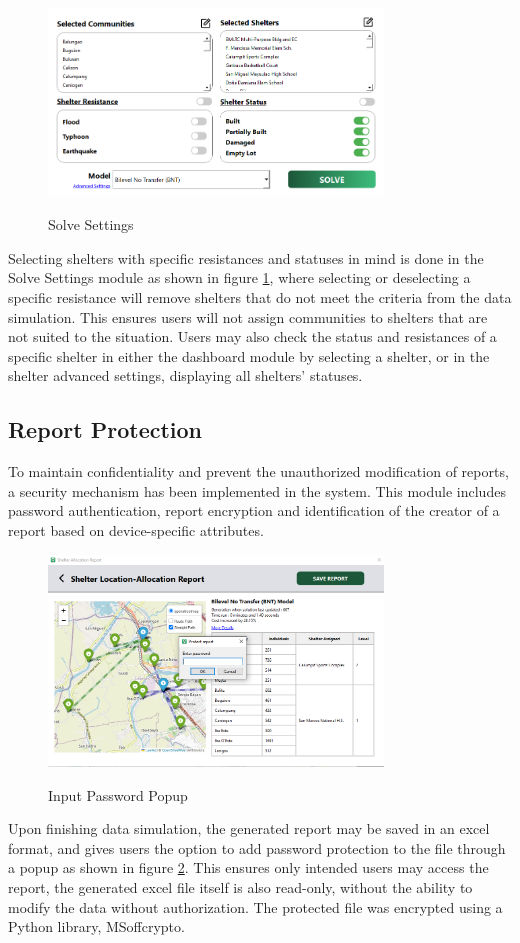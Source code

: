 	\begin{figure}[h!]
		\caption{Solve Settings}
		\centering
		\includegraphics[width=3.5in]{Chapter 4/solvesettings}
		\label{solveSet}
	\end{figure}
	Selecting shelters with specific resistances and statuses in mind is done in the Solve Settings module as shown in figure \ref{solveSet}, where selecting or deselecting a specific resistance will remove shelters that do not meet the criteria from the data simulation. This ensures users will not assign communities to shelters that are not suited to the situation. Users may also check the status and resistances of a specific shelter in either the dashboard module by selecting a shelter, or in the shelter advanced settings, displaying all shelters’ statuses.
	

\subsection{Report Protection}
	To maintain confidentiality and prevent the unauthorized modification of reports, a security mechanism has been implemented in the system. This module includes password authentication, report encryption and identification of the creator of a report based on device-specific attributes.
	
	\begin{figure}[h!]
		\caption{Input Password Popup}
		\centering
		\includegraphics[width=3.5in]{Chapter 4/alloc report pass}
		\label{passPop}
	\end{figure}
	Upon finishing data simulation, the generated report may be saved in an excel format, and gives users the option to add password protection to the file through a popup as shown in figure \ref{passPop}. This ensures only intended users may access the report, the generated excel file itself is also read-only, without the ability to modify the data without authorization. The protected file was encrypted using a Python library, MSoffcrypto.
	
